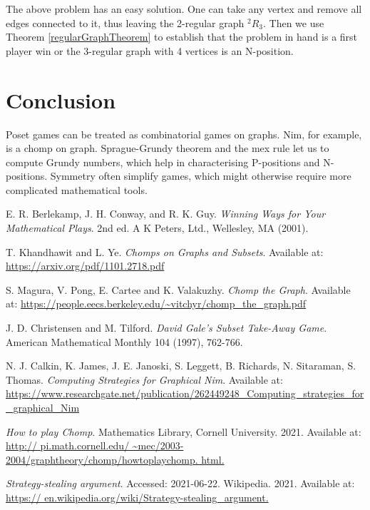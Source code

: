 \documentclass[a4paper, 12pt]{article}
\theoremstyle{remark} %
\begin{document}
The above problem has an easy solution. One can take any vertex and remove all edges connected to it, thus leaving the 2-regular graph $^2 R_3$. Then we use Theorem \ref{regularGraphTheorem} to establish that the problem in hand is a first player win or the 3-regular graph with 4 vertices is an N-position.

\section{Conclusion}

Poset games can be treated as combinatorial games on graphs. Nim, for example, is a chomp on graph. Sprague-Grundy theorem and the mex rule let us to compute Grundy numbers, which help in characterising P-positions and N-positions. Symmetry often simplify games, which might otherwise require more complicated mathematical tools.



\begin{thebibliography}{4}
	E. R. Berlekamp, J. H. Conway, and R. K. Guy.
	\textit{Winning Ways for Your Mathematical Plays}. 2nd ed.
	A K Peters, Ltd., Wellesley, MA (2001).
	
	T. Khandhawit and L. Ye.
	\textit{Chomps on Graphs and Subsets}.
	Available at: \url{https://arxiv.org/pdf/1101.2718.pdf}
	
	S. Magura, V. Pong, E. Cartee and K. Valakuzhy.
	\textit{Chomp the Graph}.
	Available at: \url{https://people.eecs.berkeley.edu/~vitchyr/chomp_the_graph.pdf}
	
	J. D. Christensen and M. Tilford.
	\textit{David Gale's Subset Take-Away Game}.
	American Mathematical Monthly 104 (1997), 762-766.
	
	N. J. Calkin, K. James, J. E. Janoski, S. Leggett, B. Richards, N. Sitaraman, S. Thomas.
	\textit{Computing Strategies for Graphical Nim}.
	Available at: \url{https://www.researchgate.net/publication/262449248_Computing_strategies_for_graphical_Nim}
	
	\textit{How to play Chomp}.
	Mathematics Library, Cornell University. 2021.
	Available at: \url{http://
		pi.math.cornell.edu/ ~mec/2003-2004/graphtheory/chomp/howtoplaychomp.
		html.}
	
	\textit{Strategy-stealing argument}.
	Accessed: 2021-06-22. Wikipedia. 2021.
	Available at: \url{https://
		en.wikipedia.org/wiki/Strategy-stealing_argument.}
	
\end{thebibliography}
\end{document}
